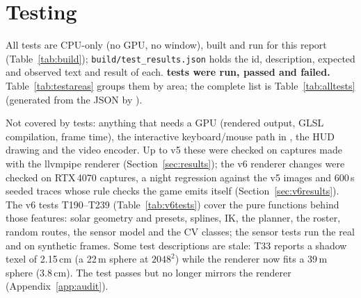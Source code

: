 \section{Testing}\label{sec:testing}
All tests are CPU-only (no GPU, no window), built and run for this report (Table~\ref{tab:build}); \texttt{build/test\_results.json} holds the id, description, expected and observed text and result of each.
\textbf{\nTests{} tests were run, \nPass{} passed and \nFail{} failed.} Table~\ref{tab:testareas} groups them by area; the complete list is Table~\ref{tab:alltests}
(generated from the JSON by ).

\begin{table}[h]
\centering\small
\caption{Tests by area (generated).}
\label{tab:testareas}

\end{table}

Not covered by tests: anything that needs a GPU (rendered output, GLSL compilation, frame time), the interactive keyboard/mouse path in
, the HUD drawing and the video encoder. Up to v5 these were checked on captures made with the llvmpipe renderer (Section~\ref{sec:results}); the v6 renderer changes were checked on RTX\,4070 captures, a night regression against the v5 images and 600\,s seeded traces whose rule checks the game emits itself (Section~\ref{sec:v6results}). The v6 tests T190--T239 (Table~\ref{tab:v6tests}) cover the pure functions behind those features: solar geometry and presets, splines, IK, the planner, the roster, random routes, the sensor model and the CV classes; the sensor tests run the real  and  on synthetic frames.
Some test descriptions are stale: T33 reports a shadow texel of 2.15\,cm (a 22\,m sphere at $2048^2$) while the renderer now fits a 39\,m sphere (3.8\,cm). The test
passes but no longer mirrors the renderer (Appendix~\ref{app:audit}).


